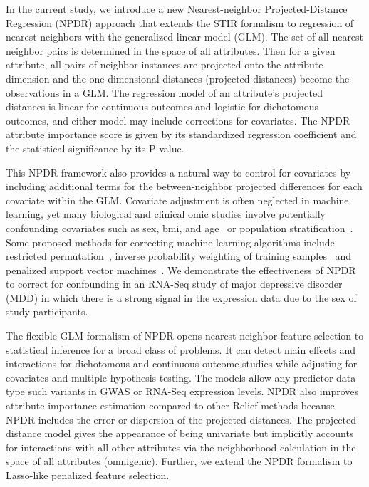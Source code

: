 \documentclass{bioinfo}
\begin{document}
In the current study, we introduce a new Nearest-neighbor Projected-Distance Regression (NPDR) approach that extends the STIR formalism to regression of nearest neighbors with the generalized linear model (GLM). The set of all nearest neighbor pairs is determined in the space of all attributes. Then for a given attribute, all pairs of neighbor instances are projected onto the attribute dimension and the one-dimensional distances (projected distances) become the observations in a GLM.  
The regression model of an attribute's projected distances is linear for continuous outcomes and logistic for dichotomous outcomes, and either model may include corrections for covariates.
The NPDR attribute importance score is given by its standardized regression coefficient and the statistical significance by its P value.

This NPDR framework also provides a natural way to control for covariates by including additional terms for the between-neighbor projected differences for each covariate within the GLM.
Covariate adjustment is often neglected in machine learning, yet many biological and clinical omic studies involve potentially confounding covariates such as sex, bmi, and age~\citep{le18_brainagesim} or population stratification~\citep{popstrat16}.
Some proposed methods for correcting machine learning algorithms include restricted permutation~\citep{rao2017}, inverse probability weighting of training samples~\citep{linn2016} and penalized support vector machines~\citep{li2011ccsvm}.
We demonstrate the effectiveness of NPDR to correct for confounding in an RNA-Seq study of major depressive disorder (MDD) in which there is a strong signal in the expression data due to the sex of study participants\citep{mostafavi14}.

The flexible GLM formalism of NPDR opens nearest-neighbor feature selection to statistical inference for a broad class of problems.
It can detect main effects and interactions for dichotomous and continuous outcome studies while adjusting for covariates and multiple hypothesis testing.
The models allow any predictor data type such variants in GWAS or RNA-Seq expression levels.
NPDR also improves attribute importance estimation compared to other Relief methods because NPDR includes the error or dispersion of the projected distances.
The projected distance model gives the appearance of being univariate but implicitly accounts for interactions with all other attributes via the neighborhood calculation in the space of all attributes (omnigenic).
Further, we extend the NPDR formalism to Lasso-like penalized feature selection.
\end{document}
